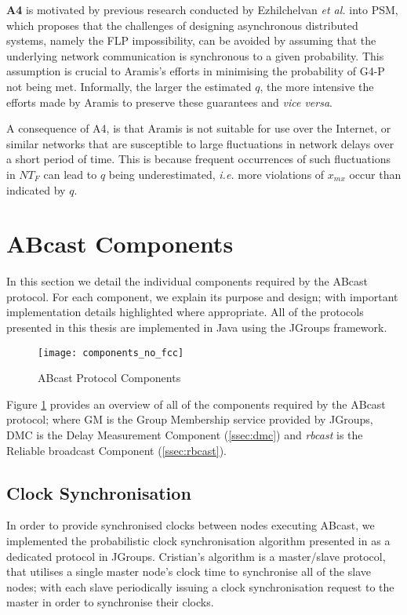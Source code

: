 \begin{description}
        \textbf{A4} is motivated by previous research conducted by Ezhilchelvan \emph{et al.} \citep{Ezhilchelvan:2010:LPR:1773912.1773927} into PSM, which proposes that the challenges of designing asynchronous distributed systems, namely the FLP impossibility, can be avoided by assuming that the underlying network communication is synchronous to a given probability.  This assumption is crucial to \textsf{Aramis}'s efforts in minimising the probability of G4-P not being met.  Informally, the larger the estimated $q$, the more intensive the efforts made by \textsf{Aramis} to preserve these guarantees and \emph{vice versa}.   
        
        A consequence of A4, is that \textsf{Aramis} is not suitable for use over the Internet, or similar networks that are susceptible to large fluctuations in network delays over a short period of time.  This is because frequent occurrences of such fluctuations in $NT_F$ can lead to $q$ being underestimated, \emph{i.e.} more violations of $x_{mx}$ occur than indicated by $q$.          
    \end{description}
    
\section{ABcast Components}
In this section we detail the individual components required by the \textsf{ABcast} protocol.  For each component, we explain its purpose and design; with important implementation details highlighted where appropriate.  All of the protocols presented in this thesis are implemented in Java using the JGroups framework.  

    \begin{figure}[!h] 
        \centering    
         \texttt{[image: components\_no\_fcc]}
         \caption[\textsf{ABcast} Protocol Components Overview]{\textsf{ABcast} Protocol Components}
         \label{fig:abcast_components}
    \end{figure}
    
   Figure \ref{fig:abcast_components} provides an overview of all of the components required by the \textsf{ABcast} protocol; where GM is the Group Membership service provided by JGroups, DMC is the Delay Measurement Component (\ref{ssec:dmc}) and \emph{rbcast} is the Reliable broadcast Component (\ref{ssec:rbcast}).  

    \subsection{Clock Synchronisation}\label{ssec:clocksynch}
    In order to provide synchronised clocks between nodes executing \textsf{ABcast}, we implemented the probabilistic clock synchronisation algorithm presented in \citep{Cristian:1996:SA:227210.227231} as a dedicated protocol in JGroups.  Cristian's algorithm is a master/slave protocol, that utilises a single master node's clock time to synchronise all of the slave nodes; with each slave periodically issuing a clock synchronisation request to the master in order to synchronise their clocks.  
            
